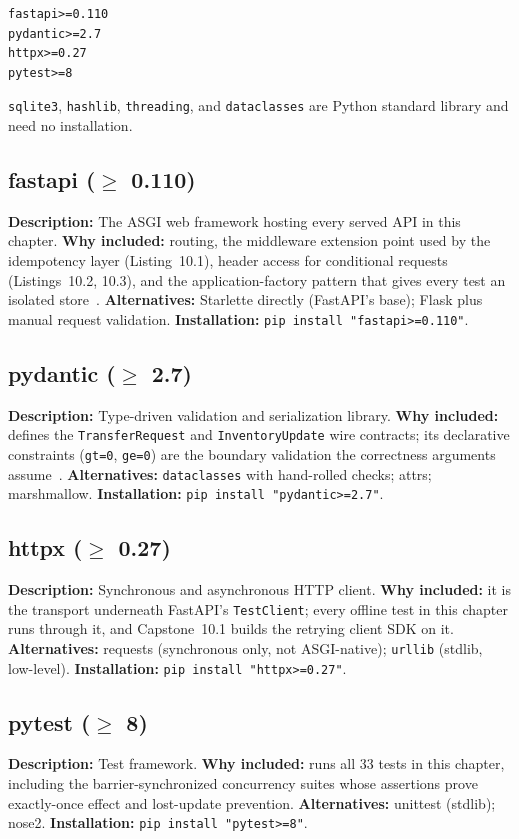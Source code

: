 \begin{verbatim}
fastapi>=0.110
pydantic>=2.7
httpx>=0.27
pytest>=8
\end{verbatim}

\texttt{sqlite3}, \texttt{hashlib}, \texttt{threading}, and
\texttt{dataclasses} are Python standard library and need no installation.

\subsection{fastapi ($\geq$ 0.110)}
\textbf{Description:} The ASGI web framework hosting every served API in
this chapter. \textbf{Why included:} routing, the middleware extension point
used by the idempotency layer (Listing~10.1), header access for conditional
requests (Listings~10.2, 10.3), and the application-factory pattern that
gives every test an isolated store~\cite{fastapidocs}.
\textbf{Alternatives:} Starlette directly (FastAPI's base); Flask plus
manual request validation. \textbf{Installation:}
\texttt{pip install "fastapi>=0.110"}.

\subsection{pydantic ($\geq$ 2.7)}
\textbf{Description:} Type-driven validation and serialization library.
\textbf{Why included:} defines the \texttt{TransferRequest} and
\texttt{InventoryUpdate} wire contracts; its declarative constraints
(\texttt{gt=0}, \texttt{ge=0}) are the boundary validation the correctness
arguments assume~\cite{pydanticdocs}. \textbf{Alternatives:}
\texttt{dataclasses} with hand-rolled checks; attrs; marshmallow.
\textbf{Installation:} \texttt{pip install "pydantic>=2.7"}.

\subsection{httpx ($\geq$ 0.27)}
\textbf{Description:} Synchronous and asynchronous HTTP client.
\textbf{Why included:} it is the transport underneath FastAPI's
\texttt{TestClient}; every offline test in this chapter runs through it, and
Capstone~10.1 builds the retrying client SDK on it. \textbf{Alternatives:}
requests (synchronous only, not ASGI-native); \texttt{urllib} (stdlib,
low-level). \textbf{Installation:} \texttt{pip install "httpx>=0.27"}.

\subsection{pytest ($\geq$ 8)}
\textbf{Description:} Test framework. \textbf{Why included:} runs all 33
tests in this chapter, including the barrier-synchronized concurrency
suites whose assertions prove exactly-once effect and lost-update
prevention. \textbf{Alternatives:} unittest (stdlib); nose2.
\textbf{Installation:} \texttt{pip install "pytest>=8"}.

